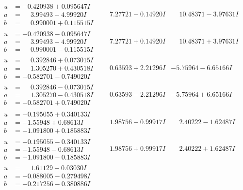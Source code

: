 \documentclass[1p]{elsarticle_modified}
\theoremstyle{definition}
\begin{document}
$$\begin{array}{c|c|c}
\begin{aligned}
u &= -0.420938 + 0.095647 I \\
a &= \phantom{-}3.99493 + 4.99920 I \\
b &= \phantom{-}0.990001 + 0.115515 I\end{aligned}
 & \phantom{-}7.27721 - 0.14920 I & \phantom{-}10.48371 - 3.97631 I \\ \hline\begin{aligned}
u &= -0.420938 - 0.095647 I \\
a &= \phantom{-}3.99493 - 4.99920 I \\
b &= \phantom{-}0.990001 - 0.115515 I\end{aligned}
 & \phantom{-}7.27721 + 0.14920 I & \phantom{-}10.48371 + 3.97631 I \\ \hline\begin{aligned}
u &= \phantom{-}0.392846 + 0.073015 I \\
a &= \phantom{-}1.305270 + 0.430518 I \\
b &= -0.582701 - 0.749020 I\end{aligned}
 & \phantom{-}0.63593 + 2.21296 I & -5.75964 - 6.65166 I \\ \hline\begin{aligned}
u &= \phantom{-}0.392846 - 0.073015 I \\
a &= \phantom{-}1.305270 - 0.430518 I \\
b &= -0.582701 + 0.749020 I\end{aligned}
 & \phantom{-}0.63593 - 2.21296 I & -5.75964 + 6.65166 I \\ \hline\begin{aligned}
u &= -0.195055 + 0.340133 I \\
a &= -1.55948 + 0.68613 I \\
b &= -1.091800 + 0.185883 I\end{aligned}
 & \phantom{-}1.98756 - 0.99917 I & \phantom{-}2.40222 - 1.62487 I \\ \hline\begin{aligned}
u &= -0.195055 - 0.340133 I \\
a &= -1.55948 - 0.68613 I \\
b &= -1.091800 - 0.185883 I\end{aligned}
 & \phantom{-}1.98756 + 0.99917 I & \phantom{-}2.40222 + 1.62487 I \\ \hline\begin{aligned}
u &= \phantom{-}1.61129 + 0.03030 I \\
a &= -0.088005 - 0.279498 I \\
b &= -0.217256 - 0.380886 I\end{aligned}

\end{array}$$
\end{document}
